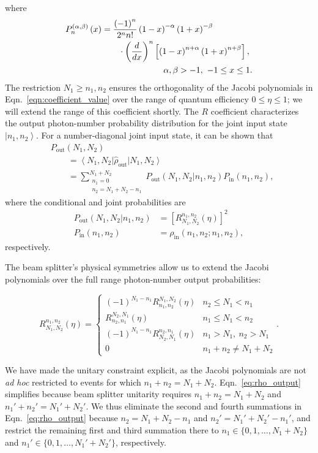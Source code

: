 \documentclass[aps,twocolumn,secnumarabic,amsmath,amssymb,pra,groupedaddress,
showpacs, showkeys,draft]{revtex4-1}
\newcommand{\bra}[1]{\left\langle #1 \right|}
\newcommand{\ket}[1]{\left|#1\right\rangle}
\newcommand{\pna}[1]{\left(#1\right)}
\newcommand{\pnb}[1]{\left[#1\right]}
\newcommand{\eqn}[1]{
\begin{equation}
	#1
\end{equation}
}
\begin{document}
where
\begin{align}
P_n^{\pna{\alpha,\beta}}\pna{x} & = \frac{\pna{-1}^n}{2^n
  n!}\pna{1-x}^{-\alpha}\pna{1+x}^{-\beta}\nonumber \\ & \qquad \cdot\pna{\frac{d}{dx}}^n\pnb{\pna{1-x}^{n+\alpha}\pna{1+x}^{n+\beta}},\nonumber \\
& \hspace{1.0in} \alpha,\beta >-1,~-1\leq x \leq 1.
\end{align}
The restriction $N_1\geq n_1, n_2$ ensures the orthogonality of the Jacobi
polynomials in Eqn.~\ref{eqn:coefficient_value} over the range of quantum
efficiency $0\leq \eta \leq 1$; we will extend the range of this coefficient
shortly. The $R$ coefficient characterizes the output photon-number probability
distribution for the joint input state $\ket{n_1,n_2}$. For a number-diagonal
joint input state, it can be shown that
\begin{align}
    & P_{\textrm{out}}\pna{N_1, N_2}  \nonumber \\ 
    & \qquad = \bra{N_1, N_2} \hat{\rho}_{\textrm{out}}\ket{N_1, N_2} \nonumber \\
    & \qquad = \sum_{\substack{n_1=0\\n_2=N_1+N_2-n_1}}^{N_1+N_2}P_{\textrm{out}}\pna{N_1,
      N_2|n_1, n_2} P_{\textrm{in}}\pna{n_1, n_2},
\end{align}
where the conditional and joint probabilities are 
\begin{align}
P_{\textrm{out}}\pna{N_1, N_2|n_1, n_2} & =
\pnb{R_{N_1,N_2}^{n_1,n_2}\pna{\eta}}^2 \nonumber \\
P_{\textrm{in}}\pna{n_1, n_2} & = \rho_{\textrm{in}}\pna{n_1,n_2;n_1,n_2},
\end{align} respectively.

The beam splitter's physical symmetries allow us to extend the Jacobi
polynomials over the full range photon-number output probabilities:
\begin{widetext}
\eqn{
   R_{N_1,N_2}^{n_1,n_2}\pna{\eta} = \left\{
     \begin{array}{lr}
        \pna{-1}^{N_1 - n_1} R_{n_1,n_2}^{N_1,N_2}\pna{\eta} & n_2 \leq N_1 < n_1 \\
       R_{n_2,n_1}^{N_2,N_1}\pna{\eta} & n_1 \leq N_1 < n_2 \\
	   \pna{-1}^{N_1 - n_1} R_{N_2,N_1}^{n_2,n_1}\pna{\eta} & n_1 > N_1,~n_2 > N_1 \\
	0 & n_1+n_2\neq N_1+N_2
     \end{array}
\right..}
\end{widetext}
We have made the unitary constraint explicit, as the Jacobi polynomials are not
\emph{ad hoc} restricted to events for which
$n_1+n_2=N_1+N_2$. Eqn.~\ref{eq:rho_output} simplifies because beam splitter
unitarity requires $n_1+n_2=N_1+N_2$ and $n_1'+n_2'=N_1'+N_2'$. We thus
eliminate the second and fourth summations in Eqn.~\ref{eq:rho_output} because
$n_2=N_1+N_2-n_1$ and $n_2'=N_1'+N_2'-n_1'$, and restrict the remaining first
and third summation there to $n_1\in\{0,1,\ldots,N_1+N_2\}$ and
$n_1'\in\{0,1,\ldots,N_1'+N_2'\}$, respectively.
\end{document}
